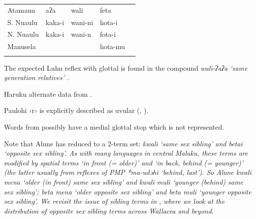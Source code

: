 \begin{table}[p]
\begin{threeparttable}
\begin{tabular}{lllll}
Atamanu	&	{\hr}aʔa	&	{\hr}wali	&	{\hr}feta&\\
S. Nuaulu	&	{\hr}kaka-i	&	{\hr}wani-ni	&	{\hr}hota-i&\\
N. Nuaulu	&	{\hr}kaka-i	&	{\hr}wani-n	&	{\hr}fota-i&\\
Manusela	&		&		&	{\hr}hota-mu\\
		\lspbottomrule
	\end{tabular}
		\begin{tablenotes}\tnsize
			\item[†]	{The expected Luhu reflex with glottal is found in the compound
								\it{wali-ʔaʔa} ‘same generation relatives’ \citep[145, note 112]{Collins1983}.}
			\item[‡]	{Haruku alternate data from \citet[137--151, {[}list 23{]}]{Stokhof1982a}.}
			\item[Δ]	{Paulohi ‹r› is explicitly described as uvular
								(\citealp[4]{Stresemann1918}, \citealp[24]{Stresemann1927}).}
			\item[‖] {Words from \citet[334]{vanEkris1865} possibly have a medial
								glottal stop which is not represented.}
		\end{tablenotes}
	\end{threeparttable}
\end{table}

Note that Alune has reduced to a 2-term set: \it{kwali} ‘same
sex sibling’ and \it{beta{\nbhyp}i} ‘opposite sex sibling’.
As with many languages in central Maluku,
these terms are modified by spatial terms ‘in front (= older)’
and ‘in back, behind (= younger)’ (the latter usually from reflexes
of PMP *ma-udəhi ‘behind, last’).
So Alune \it{kwali mena} ‘older (in front) same sex sibling’
and \it{kwali muli} ‘younger (behind) same sex sibling’;
\it{beta mena} ‘older opposite sex sibling’
and \it{beta muli} ‘younger opposite sex sibling’.
We revisit the issue of sibling terms in ,
where we look at the distribution of opposite sex sibling terms
across Wallacea and beyond.
